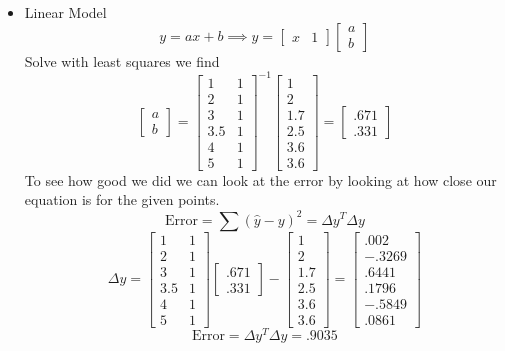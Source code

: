 \documentclass{article}
\begin{document}
\begin{itemize}
\item Linear Model
\newline
$$y = ax+b \implies y = \begin{bmatrix} x & 1 \end{bmatrix} \begin{bmatrix} a \\ b\end{bmatrix} $$
Solve with least squares we find
$$
\begin{bmatrix} a \\ b \end{bmatrix}
=
\begin{bmatrix}
1 &  1 \\
2 &  1 \\
3 &  1 \\
3.5& 1 \\
4 &  1 \\
5 &  1
\end{bmatrix}
^{-1}
\begin{bmatrix}
1 \\
2 \\
1.7\\
2.5\\
3.6\\
3.6
\end{bmatrix}
=
\begin{bmatrix} .671 \\ .331 \end{bmatrix}
$$
To see how good we did we can look at the error by looking at how close our equation is for the given points.
$$
\text{Error} = \sum{(\hat{y} - y)^2} = \Delta{y}^T\Delta{y}
$$
$$
\Delta{y} =
\begin{bmatrix}
1 &  1 \\
2 &  1 \\
3 &  1 \\
3.5& 1 \\
4 &  1 \\
5 &  1
\end{bmatrix}
\begin{bmatrix} .671 \\ .331 \end{bmatrix}
-
\begin{bmatrix}
1 \\
2 \\
1.7\\
2.5\\
3.6\\
3.6
\end{bmatrix}
=
\begin{bmatrix}
.002 \\
-.3269 \\
.6441\\
.1796\\
-.5849\\
.0861
\end{bmatrix}
$$
$$ \text{Error} = \Delta{y}^T\Delta{y}= .9035 $$




\end{itemize}
\end{document}
